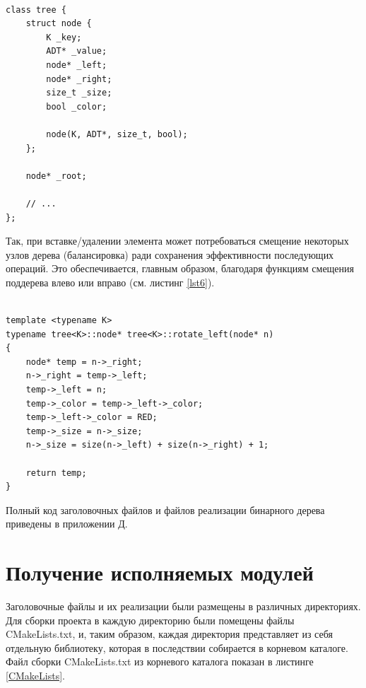 \documentclass[a4paper,12pt]{article}
\begin{document}
\begin{lstlisting}[caption={Отрывок заголовочного файла для описания бинарного дерева},label=lst5]

class tree {
	struct node {
		K _key;
		ADT* _value;
		node* _left;
		node* _right;
		size_t _size;
		bool _color;
		
		node(K, ADT*, size_t, bool);
	};
	
	node* _root;
	
	// ...
};

\end{lstlisting}

Так, при вставке/удалении элемента может потребоваться смещение некоторых узлов дерева (балансировка) ради сохранения эффективности последующих операций.
Это обеспечивается, главным образом, благодаря функциям смещения поддерева влево или вправо (см. листинг \ref{lst6}).
	
\begin{lstlisting}[caption={Функция смещения поддерева влево},label=lst6]

template <typename K>
typename tree<K>::node* tree<K>::rotate_left(node* n)
{
	node* temp = n->_right;
	n->_right = temp->_left;
	temp->_left = n;
	temp->_color = temp->_left->_color;
	temp->_left->_color = RED;
	temp->_size = n->_size;
	n->_size = size(n->_left) + size(n->_right) + 1;
	
	return temp;
}

\end{lstlisting}

Полный код заголовочных файлов и файлов реализации бинарного дерева приведены в приложении Д.

\cleardoublepage

\section{Получение исполняемых модулей}

Заголовочные файлы и их реализации были размещены в различных директориях.
Для сборки проекта в каждую директорию были помещены файлы CMakeLists.txt, и, таким образом, каждая директория представляет из себя отдельную библиотеку, которая в последствии собирается в корневом каталоге.
Файл сборки CMakeLists.txt из корневого каталога показан в листинге \ref{CMakeLists}.
\end{document}
